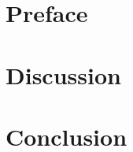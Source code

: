 







\section*{Preface}




\newpage
\tableofcontents
\newpage







\section{Discussion}

\section{Conclusion}

